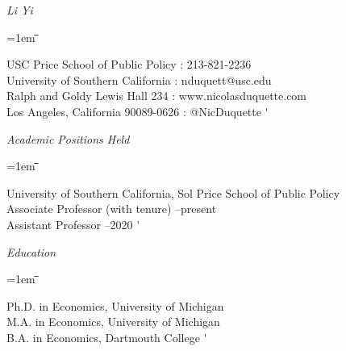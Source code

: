 \documentclass[12pt]{article}
\newlength{\midlength}
\newlength{\firstlength}
\newlength{\listindent}
\newcommand{\heading}[1]{
	{\setlength{\parskip}{0.8cm plus6mm minus3mm}
	\parindent=0pt
	\large \textit{{#1}}}
	\vspace{0.1em}
}
\newenvironment{datetabbing}{
	\begin{tabbing}
	\parskip=1em
	\hspace*{\listindent}\=\hspace*{\firstlength}\=\hspace*{\midlength}\= \kill
}{
	\end{tabbing}
}
\begin{document}

\noindent
{\Large \textit{Li Yi}}
\begin{datetabbing}
	USC Price School of Public Policy		\>\>\>	\faPhone: 213-821-2236						\'	\\
	University of Southern California		\>\>\>	: nduquett@usc.edu			\'	\\
	Ralph and Goldy Lewis Hall 234			\>\>\>	\faGlobe: www.nicolasduquette.com			\'	\\
	Los Angeles, California 90089-0626  		\>\>\>	\faTwitter: @NicDuquette					\'	%
\end{datetabbing}


				
\heading{Academic Positions Held}

\begin{datetabbing}
\>	University of Southern California, Sol Price School of Public Policy			\\
\>	\>	Associate Professor	(with tenure)				--present	\'	\\	%
\>	\>	Assistant Professor								--2020		\'	%
\end{datetabbing}

\heading{Education}

\begin{datetabbing}
\>	Ph.D. in Economics, University of Michigan			\>\>	2014	\' 		\\
\>	M.A. in Economics, University of Michigan			\>\>	2010	\' 		\\
\>	B.A. in Economics,	Dartmouth College				\>\>	2004	\' %
\end{datetabbing}


\end{document}
